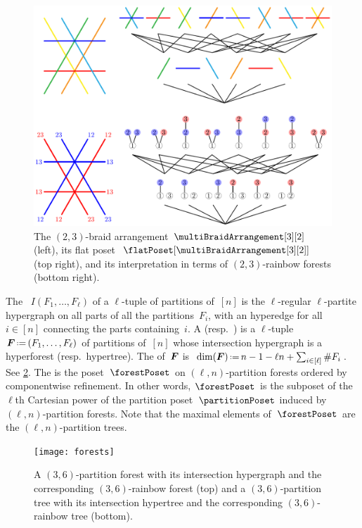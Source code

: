 \begin{figure}
	\centerline{\includegraphics[scale=.9]{figures/intersectionPosetMultiBraidArrangement32Full}}
	\caption{The $(2,3)$-braid arrangement $\multiBraidArrangement[3][2]$ (left), its flat poset~$\flatPoset[{\multiBraidArrangement[3][2]}]$ (top right), and its interpretation in terms of $(2,3)$-rainbow forests (bottom right).}
	\label{fig:MultiBraidArrangement32}
\end{figure}


\begin{definition}
The ~$I(F_1, \dots, F_\ell)$ of a $\ell$-tuple of partitions of~$[n]$ is the $\ell$-regular $\ell$-partite hypergraph on all parts of all the partitions~$F_i$, with an hyperedge for all~$i \in [n]$ connecting the parts containing~$i$.
A  (resp.~) is a $\ell$-tuple~$\b{F} \eqdef (F_1, \dots, F_\ell)$ of partitions of~$[n]$ whose intersection hypergraph is a hyperforest (resp.~hypertree).
The  of~$\boldsymbol{F}$ is~$\dim(\b{F}) \eqdef n - 1 - \ell n + \sum_{i \in [\ell]} \#F_i$.
See \cref{fig:forests}.
The  is the poset~$\forestPoset$ on $(\ell,n)$-partition forests ordered by componentwise refinement.
In other words, $\forestPoset$ is the subposet of the $\ell$th Cartesian power of the partition poset~$\partitionPoset$ induced by $(\ell,n)$-partition forests.
Note that the maximal elements of~$\forestPoset$ are the $(\ell, n)$-partition trees.
%
\begin{figure}
	\centerline{\texttt{[image: forests]}}
	\caption{A $(3,6)$-partition forest with its intersection hypergraph and the corresponding $(3,6)$-rainbow forest (top) and a $(3,6)$-partition tree with its intersection hypertree and the corresponding $(3,6)$-rainbow tree (bottom).}
	\label{fig:forests}
\end{figure}
\end{definition}

